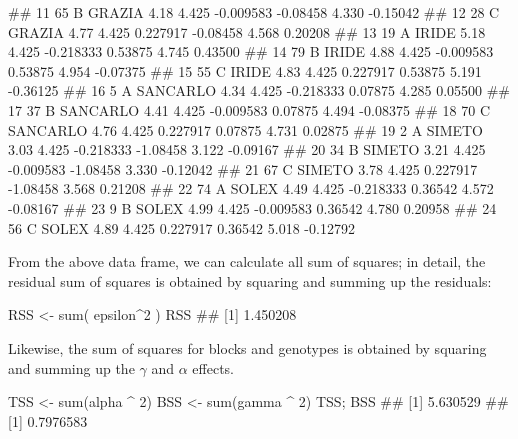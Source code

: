 \documentclass[a4paper,12pt,oneside]{book}
\newenvironment{Shaded}{\begin{snugshade}}{\end{snugshade}}
\newcommand{\DecValTok}[1]{#1}
\newcommand{\SpecialCharTok}[1]{#1}
\newcommand{\DocumentationTok}[1]{#1}
\newcommand{\OtherTok}[1]{#1}
\newcommand{\FunctionTok}[1]{#1}
\newcommand{\NormalTok}[1]{#1}
\begin{document}
\begin{Shaded}
\begin{Highlighting}[]
\DocumentationTok{\#\# 11   65     B   GRAZIA  4.18 4.425 {-}0.009583 {-}0.08458 4.330 {-}0.15042}
\DocumentationTok{\#\# 12   28     C   GRAZIA  4.77 4.425  0.227917 {-}0.08458 4.568  0.20208}
\DocumentationTok{\#\# 13   19     A    IRIDE  5.18 4.425 {-}0.218333  0.53875 4.745  0.43500}
\DocumentationTok{\#\# 14   79     B    IRIDE  4.88 4.425 {-}0.009583  0.53875 4.954 {-}0.07375}
\DocumentationTok{\#\# 15   55     C    IRIDE  4.83 4.425  0.227917  0.53875 5.191 {-}0.36125}
\DocumentationTok{\#\# 16    5     A SANCARLO  4.34 4.425 {-}0.218333  0.07875 4.285  0.05500}
\DocumentationTok{\#\# 17   37     B SANCARLO  4.41 4.425 {-}0.009583  0.07875 4.494 {-}0.08375}
\DocumentationTok{\#\# 18   70     C SANCARLO  4.76 4.425  0.227917  0.07875 4.731  0.02875}
\DocumentationTok{\#\# 19    2     A   SIMETO  3.03 4.425 {-}0.218333 {-}1.08458 3.122 {-}0.09167}
\DocumentationTok{\#\# 20   34     B   SIMETO  3.21 4.425 {-}0.009583 {-}1.08458 3.330 {-}0.12042}
\DocumentationTok{\#\# 21   67     C   SIMETO  3.78 4.425  0.227917 {-}1.08458 3.568  0.21208}
\DocumentationTok{\#\# 22   74     A    SOLEX  4.49 4.425 {-}0.218333  0.36542 4.572 {-}0.08167}
\DocumentationTok{\#\# 23    9     B    SOLEX  4.99 4.425 {-}0.009583  0.36542 4.780  0.20958}
\DocumentationTok{\#\# 24   56     C    SOLEX  4.89 4.425  0.227917  0.36542 5.018 {-}0.12792}
\end{Highlighting}
\end{Shaded}

\normalsize

From the above data frame, we can calculate all sum of squares; in detail, the residual sum of squares is obtained by squaring and summing up the residuals:

\vspace{12pt}

\begin{Shaded}
\begin{Highlighting}[]
\NormalTok{RSS }\OtherTok{\textless{}{-}} \FunctionTok{sum}\NormalTok{( epsilon}\SpecialCharTok{\^{}}\DecValTok{2}\NormalTok{ )}
\NormalTok{RSS}
\DocumentationTok{\#\# [1] 1.450208}
\end{Highlighting}
\end{Shaded}

Likewise, the sum of squares for blocks and genotypes is obtained by squaring and summing up the \(\gamma\) and \(\alpha\) effects.

\vspace{12pt}

\begin{Shaded}
\begin{Highlighting}[]
\NormalTok{TSS }\OtherTok{\textless{}{-}} \FunctionTok{sum}\NormalTok{(alpha }\SpecialCharTok{\^{}} \DecValTok{2}\NormalTok{)}
\NormalTok{BSS }\OtherTok{\textless{}{-}} \FunctionTok{sum}\NormalTok{(gamma }\SpecialCharTok{\^{}} \DecValTok{2}\NormalTok{)}
\NormalTok{TSS; BSS}
\DocumentationTok{\#\# [1] 5.630529}
\DocumentationTok{\#\# [1] 0.7976583}
\end{Highlighting}
\end{Shaded}
\end{document}

